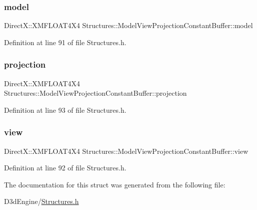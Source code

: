 \subsubsection{\texorpdfstring{model}{model}}
{\footnotesize\ttfamily Direct\+X\+::\+X\+M\+F\+L\+O\+A\+T4\+X4 Structures\+::\+Model\+View\+Projection\+Constant\+Buffer\+::model}



Definition at line 91 of file Structures.\+h.

\mbox{\label{struct_structures_1_1_model_view_projection_constant_buffer_a515d9a03f96f1d6d35a0713b6fef0386}} 
\subsubsection{\texorpdfstring{projection}{projection}}
{\footnotesize\ttfamily Direct\+X\+::\+X\+M\+F\+L\+O\+A\+T4\+X4 Structures\+::\+Model\+View\+Projection\+Constant\+Buffer\+::projection}



Definition at line 93 of file Structures.\+h.

\mbox{\label{struct_structures_1_1_model_view_projection_constant_buffer_aede4441ba5f179e090eb088d735ffd34}} 
\subsubsection{\texorpdfstring{view}{view}}
{\footnotesize\ttfamily Direct\+X\+::\+X\+M\+F\+L\+O\+A\+T4\+X4 Structures\+::\+Model\+View\+Projection\+Constant\+Buffer\+::view}



Definition at line 92 of file Structures.\+h.



The documentation for this struct was generated from the following file\+:\begin{DoxyCompactItemize}
\item 
D3d\+Engine/\mbox{\hyperlink{_structures_8h}{Structures.\+h}}\end{DoxyCompactItemize}
